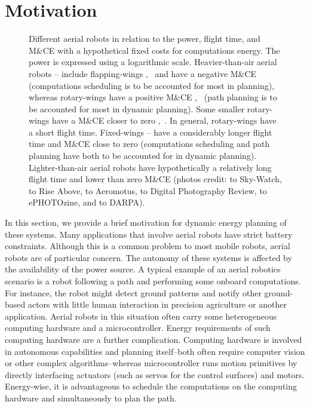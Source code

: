 \section{Motivation}
\label{sec:motivation}

\begin{figure}[t!]
  \centering
  \footnotesize{}\selectfont
  
  \caption[Different aerial robots in relation to the power, flight time, and M\&CE]{Different aerial robots in relation to the power, flight time, and M\&CE with a hypothetical fixed costs for computations energy. The power is expressed using a logarithmic scale. Heavier-than-air aerial robots -- include flapping-wings ,~ and have a negative M\&CE (computations scheduling is to be accounted for most in planning), whereas rotary-wings have a positive M\&CE ,~ (path planning is to be accounted for most in dynamic planning). Some smaller rotary-wings have a M\&CE closer to zero ,~. In general, rotary-wings have a short flight time. Fixed-wings -- have a considerably longer flight time and M\&CE close to zero (computations scheduling and path planning have both to be accounted for in dynamic planning). Lighter-than-air aerial robots  have hypothetically a relatively long flight time and lower than zero M\&CE {\scriptsize(photos credit:  to Sky-Watch,  to Rise Above,  to Aeromotus,  to Digital Photography Review,  to ePHOTOzine, and  to DARPA)}.}
  \label{fig:plot10}
\end{figure}

In this section, we provide a brief motivation for dynamic energy planning of these systems.
Many applications that involve aerial robots have strict battery constraints. Although this is a common problem to most mobile robots, aerial robots are of particular concern. The autonomy of these systems is affected by the availability of the power source. A typical example of an aerial robotics scenario is a robot following a path and performing some onboard computations. For instance, the robot might detect ground patterns and notify other ground-based actors with little human interaction in precision agriculture or another application. Aerial robots in this situation often carry some heterogeneous computing hardware and a microcontroller. Energy requirements of such computing hardware are a further complication. Computing hardware is involved in autonomous capabilities and planning itself--both often require computer vision or other complex algorithms--whereas microcontroller runs motion primitives by directly interfacing actuators (such as servos for the control surfaces) and motors. Energy-wise, it is advantageous to schedule the computations on the computing hardware and simultaneously to plan the path.

